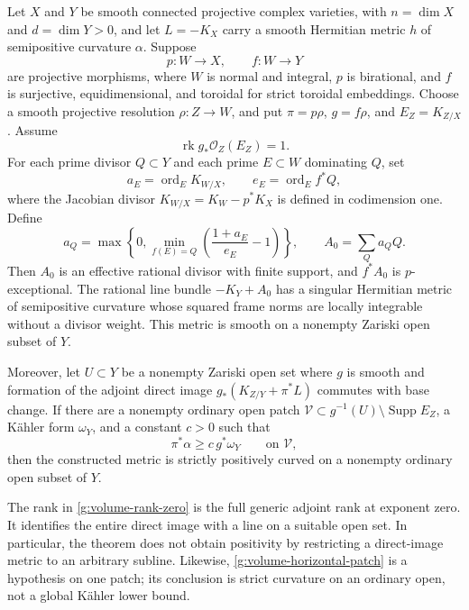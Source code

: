 \begin{theorem}\label{g:toroidal-volume}
Let $X$ and $Y$ be smooth connected projective complex varieties, with
$n=\dim X$ and $d=\dim Y>0$, and let $L=-K_X$ carry a smooth Hermitian metric $h$ of
semipositive curvature $\alpha$.  Suppose
\[
 p:W\longrightarrow X,\qquad f:W\longrightarrow Y
\]
are projective morphisms, where $W$ is normal and integral, $p$ is
birational, and $f$ is surjective, equidimensional, and toroidal for
strict toroidal embeddings.  Choose a smooth projective resolution
$\rho:Z\to W$, and put $\pi=p\rho$, $g=f\rho$, and $E_Z=K_{Z/X}$.
Assume
\begin{equation}\label{g:volume-rank-zero}
 \operatorname{rk}g_*\mathcal O_Z(E_Z)=1.
\end{equation}
For each prime divisor $Q\subset Y$ and each prime $E\subset W$
dominating $Q$, set
\[
 a_E=\operatorname{ord}_E K_{W/X},\qquad
 e_E=\operatorname{ord}_E f^*Q,
\]
where the Jacobian divisor $K_{W/X}=K_W-p^*K_X$ is defined in
codimension one.  Define
\begin{equation}\label{g:volume-correction}
 a_Q=\max\left\{0,\min_{f(E)=Q}
             \left(\frac{1+a_E}{e_E}-1\right)\right\},
 \qquad A_0=\sum_Q a_Q Q.
\end{equation}
Then $A_0$ is an effective rational divisor with finite support, and
$f^*A_0$ is $p$-exceptional.  The rational line bundle $-K_Y+A_0$
has a singular Hermitian metric of semipositive curvature whose squared
frame norms are locally integrable without a divisor weight.  This
metric is smooth on a nonempty Zariski open subset of $Y$.

Moreover, let $U\subset Y$ be a nonempty Zariski open set where $g$
is smooth and formation of the adjoint direct image
$g_*(K_{Z/Y}+\pi^*L)$ commutes with base change.  If there are a
nonempty ordinary open patch
$\mathcal V\subset g^{-1}(U)\setminus\operatorname{Supp}E_Z$,
a K\"ahler form $\omega_Y$, and a constant $c>0$ such that
\begin{equation}\label{g:volume-horizontal-patch}
 \pi^*\alpha\geq c\,g^*\omega_Y\qquad\text{on }\mathcal V,
\end{equation}
then the constructed metric is strictly positively curved on a
nonempty ordinary open subset of $Y$.
\end{theorem}

The rank in \eqref{g:volume-rank-zero} is the full generic adjoint rank
at exponent zero.  It identifies the entire direct image with a line
on a suitable open set.  In particular, the theorem does not obtain
positivity by restricting a direct-image metric to an arbitrary
subline.  Likewise, \eqref{g:volume-horizontal-patch} is a hypothesis
on one patch; its conclusion is strict curvature on an ordinary open,
not a global K\"ahler lower bound.

